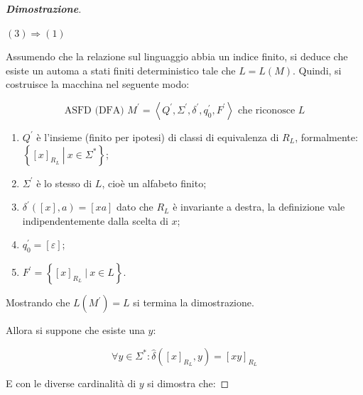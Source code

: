 \documentclass[a4paper]{article}
\begin{document}
\begin{proof}[\textbf{Dimostrazione}]
		\newpage
		
		\begin{center}
			\item[\ding{42}] $(3) \Rightarrow (1)$
		\end{center}
		
		\noindent
		Assumendo che la relazione sul linguaggio abbia un indice finito, si deduce che esiste un automa a stati finiti deterministico tale che $L = L\left(M\right)$. Quindi, si costruisce la macchina nel seguente modo:
		
		\begin{equation*}
			\text{ASFD (DFA) } M^{'} = \left\langle Q^{'}, \Sigma^{'}, \delta^{'}, q_{0}^{'}, F^{'} \right\rangle \text{ che riconosce } L
		\end{equation*}
		
		\begin{enumerate}[label=\Roman*.]
			\item $Q^{'}$ è l'insieme (finito per ipotesi) di classi di equivalenza di $R_{L}$, formalmente: $\left\{\left[x\right]_{R_{L}} \: \left| \: x \in \Sigma^{*}\right.\right\}$;
			
			\item $\Sigma^{'}$ è lo stesso di $L$, cioè un alfabeto finito;
			
			\item $\delta^{'} \left(\left[x\right], a\right) = \left[xa\right]$ dato che $R_{L}$ è invariante a destra, la definizione vale indipendentemente dalla scelta di $x$;
			
			\item $q_{0}^{'} = \left[\varepsilon\right]$;
			
			\item $F^{'} = \left\{\left[x\right]_{R_{L}} \: \left| \: x \in L \right.\right\}$.
		\end{enumerate}
		
		\noindent
		Mostrando che $L\left(M^{'}\right) = L$ si termina la dimostrazione.\newline
		
		\noindent
		Allora si suppone che esiste una $y$:
		
		\begin{equation*}
			\forall y \in \Sigma^{*} : \hat{\delta}\left(\left[x\right]_{R_{L}}, y\right) = \left[x y\right]_{R_{L}}
		\end{equation*}
		
		\noindent
		E con le diverse cardinalità di $y$ si dimostra che:
		

\end{proof}
\end{document}
